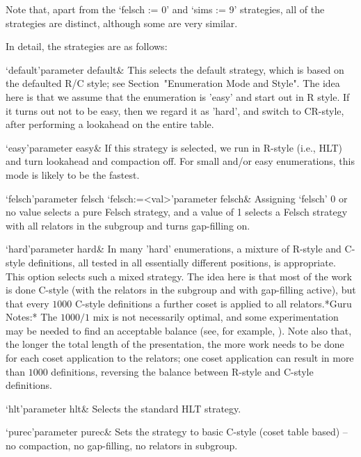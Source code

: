     Note that, apart from the `felsch := 0' and `sims := 9' strategies, all
    of the strategies are distinct, although some are very similar.

    In detail, the strategies are as follows:

    \beginitems

    \>`default'{parameter default}&
    This selects the default strategy, which is based on the defaulted R/C
    style;  see Section~"Enumeration Mode  and Style".   The idea  here is
    that  we assume  that the  enumeration is  'easy' and  start out  in R
    style.  If it turns  out not to be easy, then we  regard it as 'hard',
    and switch  to CR-style, after performing  a lookahead on  the entire
    table.

    \>`easy'{parameter easy}&
    If this strategy  is selected, we run in R-style  (i.e., HLT) and turn
    lookahead  and compaction  off.  For  small and/or  easy enumerations,
    this mode is likely to be the fastest.

    \>`felsch'{parameter felsch}
    \>`felsch:=<val>'{parameter felsch}&
    Assigning `felsch' 0 or no value selects a pure Felsch strategy, and a
    value of 1 selects a Felsch strategy with all relators in the subgroup
    and turns gap-filling on.

    \>`hard'{parameter hard}&  In many  'hard' enumerations, a  mixture of
    R-style  and  C-style  definitions,  all  tested  in  all  essentially
    different positions, is appropriate.  This option selects such a mixed
    strategy.  The  idea here  is that  most of the  work is  done C-style
    (with the relators  in the subgroup and with  gap-filling active), but
    that every  $1000$ C-style definitions  a further coset is  applied to
    all  relators.*Guru  Notes:*  The  $1000/1$  mix  is  not  necessarily
    optimal, and some experimentation may  be needed to find an acceptable
    balance (see,  for example, \cite{HR1}).   Note also that,  the longer
    the total length  of the presentation, the more work  needs to be done
    for each coset application to  the relators; one coset application can
    result in more than  $1000$ definitions, reversing the balance between
    R-style and C-style definitions.

    \>`hlt'{parameter hlt}&
    Selects the standard HLT strategy.

    \>`purec'{parameter purec}&
    Sets  the  strategy  to  basic  C-style  (coset  table  based)  --  no
    compaction, no gap-filling, no relators in subgroup.

